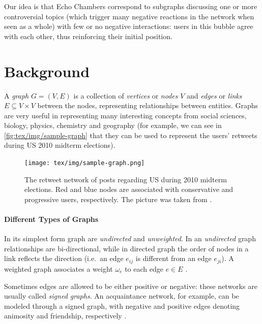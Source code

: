 Our idea is that Echo Chambers correspond to subgraphs discussing one or more
controversial topics (which trigger many negative reactions in the network when
seen as a whole) with few or no negative interactions: users in this bubble
agree with each other, thus reinforcing their initial position.

\section{Background}
\label{sec:background}

A \emph{graph} $G = (V, E)$ is a collection of \emph{vertices} or \emph{nodes} $V$ and
\emph{edges} or \emph{links} $E \subseteq V \times V$ between the nodes, representing relationships
between entities. Graphs are very useful in
representing many interesting concepts from social sciences, biology, physics,
chemistry and geography (for example, we can see in
\autoref{fig:tex/img/sample-graph} that they
can be used to represent the users' retweets during US 2010 midterm
elections)\cite{Newman2018,Menczer2020}.

\begin{figure}
	\centering
	\texttt{[image: tex/img/sample-graph.png]}
	\caption[Retweet network during 2010 midterm elections]{The retweet network of posts regarding US during 2010 midterm
		elections. Red and blue nodes are associated with conservative and
		progressive users, respectively. The picture was taken from
		\cite{Menczer2020}.}
	\label{fig:tex/img/sample-graph}
\end{figure}

\paragraph{Different Types of Graphs}%
\label{par:different_types_of_graphs}

In its simplest form graph are \emph{undirected} and \emph{unweighted}. In an
\emph{undirected} graph relationships are bi-directional, while in directed graph
the order of nodes in a link reflects the
direction (i.e.\ an edge $e_{ij} $ is different from an edge $e_{ji} $). A weighted
graph associates a weight $\omega _e$ to each edge $e \in E$
\cite{Menczer2020,AlbertLaszloNortheasternUniversity2016}.

Sometimes edges are allowed to be either positive or negative: these networks
are usually called \emph{signed graphs}. An acquaintance
network, for example, can be modeled through a signed graph, with negative and
positive edges denoting animosity and friendship, respectively \cite{Newman2018}.

